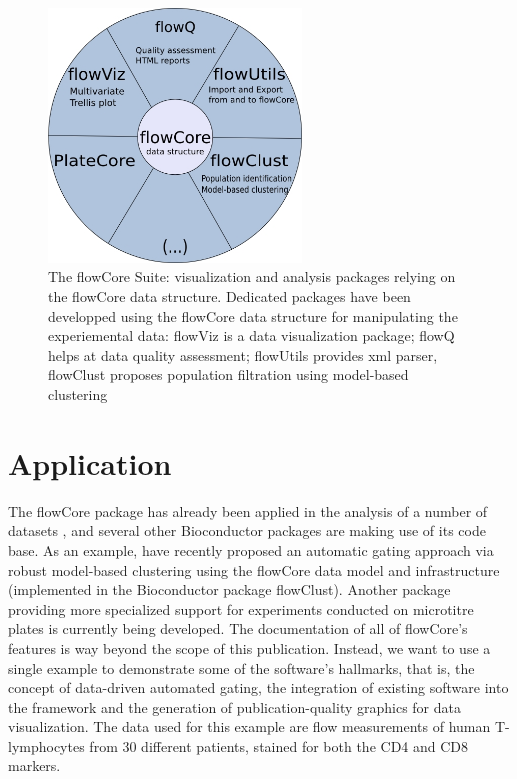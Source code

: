 \documentclass[12pt]{article}
\begin{document}
\begin{figure}
\centering
\includegraphics[width=0.6\textwidth]{Figure2-flowWheel-version4.jpg}
\caption{\label{fig2:flowWheel}{The flowCore Suite: visualization and analysis
  packages relying on the flowCore data structure.  Dedicated packages
  have been developped using the flowCore data structure for
  manipulating the experiemental data: flowViz is a data visualization
  package; flowQ helps at data quality assessment; flowUtils provides
  xml parser, flowClust proposes population 
  filtration using model-based clustering}}
\end{figure}

\section*{Application}
The flowCore package has already been applied in the analysis of a
number of datasets \citep{gasparetto2004ice,brinkman2007hcf}, and
several other Bioconductor packages are making use of its code
base. As an example, \cite{lo2008agf} have recently proposed an
automatic gating approach via robust model-based clustering using the
flowCore data model and infrastructure (implemented in the
Bioconductor package flowClust). Another package providing more
specialized support for experiments conducted on microtitre plates is
currently being developed. The documentation of all of flowCore's
features is way beyond the scope of this publication. Instead, we
want to use a single example to demonstrate some of the software's
hallmarks, that is, the concept of data-driven automated gating, the
integration of existing software into the framework and the generation
of publication-quality graphics for data visualization. The data used
for this example are flow measurements of human T-lymphocytes from 30
different patients, stained for both the CD4 and CD8 markers.
\end{document}
